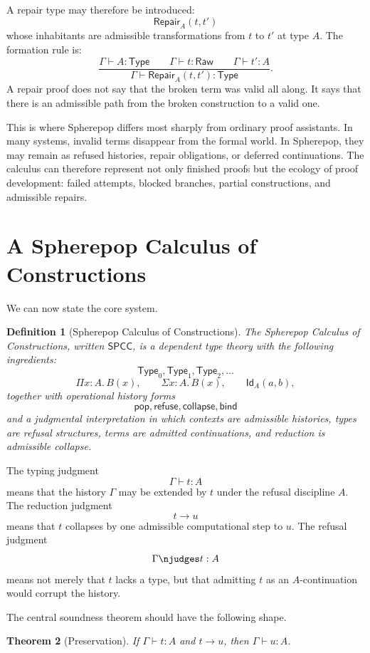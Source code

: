 \documentclass[12pt,oneside]{article}
\newtheorem{definition}{Definition}[section]
\newtheorem{theorem}[definition]{Theorem}
\newcommand{\Pop}{\mathsf{pop}}
\newcommand{\Refuse}{\mathsf{refuse}}
\newcommand{\Collapse}{\mathsf{collapse}}
\newcommand{\Bind}{\mathsf{bind}}
\newcommand{\Type}{\mathsf{Type}}
\newcommand{\Id}{\mathsf{Id}}
\newcommand{\step}{\longrightarrow}
\newcommand{\judges}{\vdash}
\begin{document}
A repair type may therefore be introduced:
\[
\mathsf{Repair}_A(t,t')
\]
whose inhabitants are admissible transformations from $t$ to $t'$ at type $A$. The formation rule is:
\[
\frac{\Gamma \judges A:\Type \qquad \Gamma \judges t:\mathsf{Raw} \qquad \Gamma \judges t':A}
{\Gamma \judges \mathsf{Repair}_A(t,t'):\Type}.
\]
A repair proof does not say that the broken term was valid all along. It says that there is an admissible path from the broken construction to a valid one.

This is where Spherepop differs most sharply from ordinary proof assistants. In many systems, invalid terms disappear from the formal world. In Spherepop, they may remain as refused histories, repair obligations, or deferred continuations. The calculus can therefore represent not only finished proofs but the ecology of proof development: failed attempts, blocked branches, partial constructions, and admissible repairs.

\section{A Spherepop Calculus of Constructions}

We can now state the core system.

\begin{definition}[Spherepop Calculus of Constructions]
The Spherepop Calculus of Constructions, written $\mathsf{SPCC}$, is a dependent type theory with the following ingredients:
\[
\Type_0,\Type_1,\Type_2,\ldots
\]
\[
\Pi x:A.\,B(x),
\qquad
\Sigma x:A.\,B(x),
\qquad
\Id_A(a,b),
\]
together with operational history forms
\[
\Pop,\Refuse,\Collapse,\Bind
\]
and a judgmental interpretation in which contexts are admissible histories, types are refusal structures, terms are admitted continuations, and reduction is admissible collapse.
\end{definition}

The typing judgment
\[
\Gamma \judges t:A
\]
means that the history $\Gamma$ may be extended by $t$ under the refusal discipline $A$. The reduction judgment
\[
t \step u
\]
means that $t$ collapses by one admissible computational step to $u$. The refusal judgment
\[
\Gamma \njudges t:A
\]
means not merely that $t$ lacks a type, but that admitting $t$ as an $A$-continuation would corrupt the history.

The central soundness theorem should have the following shape.

\begin{theorem}[Preservation]
If $\Gamma \judges t:A$ and $t \step u$, then $\Gamma \judges u:A$.
\end{theorem}
\end{document}
